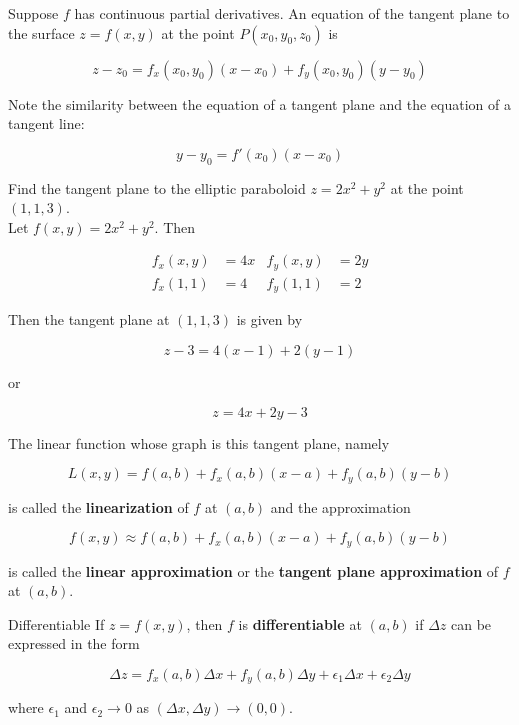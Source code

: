         Suppose $f$ has continuous partial derivatives. An equation of the tangent plane to the surface $z=f(x,y)$ at the point $P(x_0, y_0, z_0)$ is

        \[
            z - z_0 = f_x (x_0, y_0) (x-x_0) + f_y (x_0, y_0) (y-y_0)
        \]

        Note the similarity between the equation of a tangent plane and the equation of a tangent line:

        \[
            y - y_0 = f'(x_0) (x-x_0)
        \]

        \textit{} Find the tangent plane to the elliptic paraboloid $z=2x^2 + y^2$ at the point $(1,1,3)$. \\

        Let $f(x,y) = 2x^2 + y^2$. Then

        \begin{align*}
            f_x (x,y)   &= 4x & f_y (x,y) &= 2y \\
            f_x (1,1)   &= 4  & f_y (1,1) &= 2
        \end{align*}

        Then the tangent plane at $(1,1,3)$ is given by

        \[
            z - 3 = 4(x-1) + 2(y-1)
        \]

        or

        \[
            z = 4x + 2y - 3
        \]

        The linear function whose graph is this tangent plane, namely

        \[
            L(x,y) = f(a,b) + f_x (a,b)(x-a) + f_y (a,b) (y-b)
        \]

        is called the \textbf{linearization} of $f$ at $(a,b)$ and the approximation

        \[
            f(x,y) \approx f(a,b) + f_x (a,b) (x-a) + f_y (a,b) (y-b)
        \]

        is called the \textbf{linear approximation} or the \textbf{tangent plane approximation} of $f$ at $(a,b)$. \\

        \begin{axiom}{Differentiable}
            If $z=f(x,y)$, then $f$ is \textbf{differentiable} at $(a,b)$ if $\Delta z$ can be expressed in the form

            \[
                \Delta z = f_x (a,b) \Delta x + f_y (a,b) \Delta y + \epsilon_1 \Delta x + \epsilon_2 \Delta y
            \]

            where $\epsilon_1$ and $\epsilon_2 \to 0$ as $(\Delta x, \Delta y)\to (0,0)$.
        \end{axiom}

